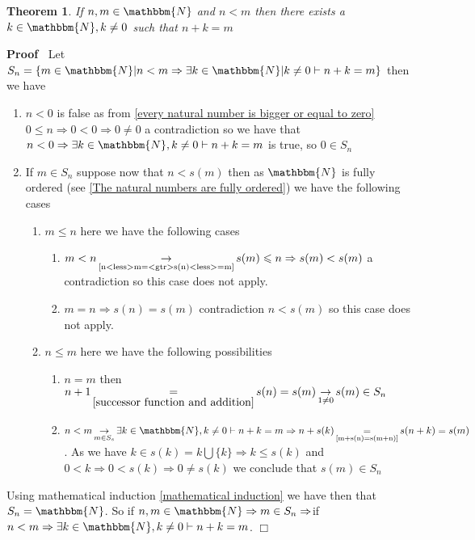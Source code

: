 \documentclass{book}
\newcommand{\Rightarrowlim}{\mathop{\rightarrow}\limits}
\newcommand{\equallim}{\mathop{=}\limits}
\newcommand{\upl}{+}
\newenvironment{proof}{\noindent\textbf{Proof\ }}{\hspace*{\fill}$\Box$\medskip}
\newtheorem{theorem}{Theorem}
\begin{document}
{{\begin{theorem}
  \label{n<less>m=<gtr>exists a k such that n+k=m n,m natural nubers}If $n, m
  \in \mathbbm{N}$ and $n < m$ then there exists a $k \in \mathbbm{N}, k \neq
  0$ such that $n \upl k = m$
\end{theorem}

\begin{proof}
  Let $S_n = \{ m \in \mathbbm{N} | n < m \Rightarrow \exists k \in
  \mathbbm{N} | k \neq 0 \vdash n \upl k = m \}$ then we have
  \begin{enumerate}
    \item $n < 0$ is false as from \ref{every natural number is bigger or
    equal to zero} $0 \leqslant n \Rightarrow 0 < 0 \Rightarrow 0 \neq 0$ a
    contradiction so we have that $n < 0 \Rightarrow \exists k \in
    \mathbbm{N}, k \neq 0 \vdash n + k = m$ is true, so $0 \in S_n$
    
    \item If $m \in S_n$ suppose now that $n < s (m)$ then as $\mathbbm{N}$ is
    fully ordered (see \ref{The natural numbers are fully ordered}) we have
    the following cases
    \begin{enumerate}
      \item $m \leqslant n$ here we have the following cases
      \begin{enumerate}
        \item $m < n \Rightarrowlim_{\text{\ref{n<less>m=<gtr>s(n)<less>=m}}}
        s (m) \leqslant n \Rightarrow s (m) < s (m)$ a contradiction so this
        case does not apply.
        
        \item $m = n \Rightarrow s (n) = s (m)$ contradiction $n < s (m)$ so
        this case does not apply.
      \end{enumerate}
      \item $n \leqslant m$ here we have the following possibilities
      \begin{enumerate}
        \item $n = m$ then $n \upl 1 \equallim_{\ref{successor function and
        addition}} s (n) = s (m) \Rightarrowlim_{1 \neq 0} s (m) \in S_n$
        
        \item $n < m \Rightarrowlim_{m \in S_s} \exists k \in \mathbbm{N}, k
        \neq 0 \vdash n \upl k = m \Rightarrow n \upl s (k)
        \equallim_{\text{\ref{m+s(n)=s(m+n)}}} s (n + k) = s (m)$. As we have
        $k \in s (k) = k \bigcup \{ k \} \Rightarrow k \leqslant s (k)$ and $0
        < k \Rightarrow 0 < s (k) \Rightarrow 0 \neq s (k)$ we conclude that
        $s (m) \in S_n$
      \end{enumerate}
    \end{enumerate}
  \end{enumerate}
  Using mathematical induction \ref{mathematical induction} we have then that
  $S_n =\mathbbm{N}$. So if $n, m \in \mathbbm{N} \Rightarrow m \in S_n
  \Rightarrow$if $n < m \Rightarrow \exists k \in \mathbbm{N}, k \neq 0 \vdash
  n + k = m$.
\end{proof}

}}
\end{document}
